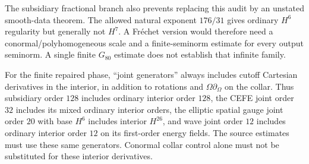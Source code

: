 The subsidiary fractional branch also prevents replacing this audit by an
unstated smooth-data theorem.  The allowed natural exponent
$176/31$ gives ordinary $H^6$ regularity but generally not $H^7$.
A Fr\'echet version would therefore need a conormal/polyhomogeneous scale and
a finite-seminorm estimate for every output seminorm.  A single finite
$G_{80}$ estimate does not establish that infinite family.

For the finite repaired phase, ``joint generators'' always includes
cutoff Cartesian derivatives in the interior, in addition to rotations and
$\Omega\partial_\Omega$ on the collar.  Thus subsidiary order $128$ includes
ordinary interior order $128$, the CEFE joint order $32$ includes its mixed
ordinary interior orders, the elliptic spatial gauge joint order $20$ with
base $H^6$ includes interior $H^{26}$, and wave joint order $12$ includes
ordinary interior order $12$ on its first-order energy fields.  The source
estimates must use these same generators.  Conormal collar control alone
must not be substituted for these interior derivatives.
